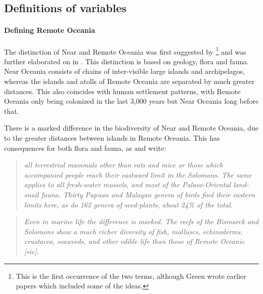 \documentclass[unnumsec,webpdf,modern,medium]{oup-authoring-template}
\begin{document}
\subsection{Definitions of variables}
\label{appendix_def}
\FloatBarrier
\paragraph{Defining Remote Oceania}
The distinction of Near and Remote Oceania was first suggested by \citet{pawley1973dating}\footnote{This is the first occurrence of the two terms, although Green wrote earlier papers which included some of the ideas.} and was further elaborated on in \citet{green1991near}. This distinction is based on geology, flora and fauna. Near Oceania consists of chains of inter-visible large islands and archipelagos, whereas the islands and atolls of Remote Oceania are separated by much greater distances. This also coincides with human settlement patterns, with Remote Oceania only being colonized in the last 3,000 years but Near Oceania long before that.

There is a marked difference in the biodiversity of Near and Remote Oceania, due to the greater distances between islands in Remote Oceania. This has consequences for both flora and fauna, as \citet{green1991near} and \citet{pawley2007locatingoceanic} write:

\begin{quotation}
\noindent \emph{all terrestrial mammals other than rats and mice or those which accompanied people reach their eastward limit in the Solomons. The same applies to all fresh-water mussels, and most of the Palaeo-Oriental land-snail fauna. Thirty Papuan and Malayan genera of birds find their eastern limits here, as do 162 genera of seed-plants, about 24\% of the total.}
\end{quotation}
\begin{flushright} \citet[495]{green1991near}
\end{flushright}

\begin{quotation}
\noindent \emph{Even in marine life the difference is marked. The reefs of the Bismarck and Solomons show a much richer diversity of fish, molluscs, echinoderms, crustacea, seaweeds, and other edible life than those of Remote Oceanic [sic].}
\end{quotation}
\begin{flushright}  \citet[19]{pawley2007locatingoceanic} \end{flushright}
\end{document}
